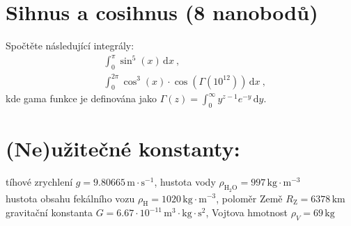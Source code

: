 \documentclass[10pt,a4paper,landscape]{article}
\begin{document}
\begin{multicols}{2}[]
\section{Sihnus a cosihnus (8 nanobodů)}
Spočtěte následující integrály:
\begin{subequations}
\begin{align}
&\int_0^\pi \sin^5\left(x\right)\,\mathrm{d}x ~,\\
&\int_0^{2\pi} \cos^3\left(x\right)\cdot\cos\left(\Gamma\left(10^{12}\right)\right)\,\mathrm{d}x ~,
\end{align}
\end{subequations}
kde gama funkce je definována jako $\Gamma\left(z\right) = \int_0^\infty y^{z-1}e^{-y}\,\mathrm{d}y$.

\section*{(Ne)užitečné konstanty:}
tíhové zrychlení $g = 9.80665\,\mathrm{m}\cdot\mathrm{s}^{-1}$, hustota vody $\rho_{\mathrm{H}_2\mathrm{O}} = 997\,\mathrm{kg}\cdot\mathrm{m}^{-3}$\\
hustota obsahu fekálního vozu $\rho_\mathrm{H} = 1020\,\mathrm{kg}\cdot\mathrm{m}^{-3}$, poloměr Země $R_\mathrm{Z} = 6378\,\mathrm{km}$\\
gravitační konstanta $G = 6.67\cdot 10^{-11}\, \mathrm{m}^3\cdot\mathrm{kg}\cdot \mathrm{s}^2$, Vojtova hmotnost $\rho_V = 69\,\mathrm{kg}$

\end{multicols}
\end{document}
